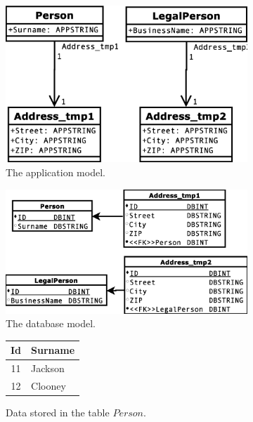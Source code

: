 \documentclass[11pt]{article}
\begin{document}
\begin{figure}
\begin{subfigure}[b]{0.45\textwidth}
	\includegraphics[width=\textwidth]{./images/case_app_5}
	\caption{The application model.}
\end{subfigure}
\begin{subfigure}[b]{0.45\textwidth}
	\includegraphics[width=\textwidth]{./images/case_db_5}
	\caption{The database model.}
\end{subfigure}
\begin{subfigure}[b]{0.5\textwidth}
	\centering
	\begin{tabular}{| c | l |}
	 	\hline
		Id &  Surname \\ \hline  
		11 & Jackson  \\ \hline
		12 & Clooney  \\ \hline
	\end{tabular}
	\caption{Data stored in the table $Person$.}
\end{subfigure}
\begin{subfigure}[b]{0.5\textwidth}
	\centering
	\begin{tabular}{| c | l |}

\end{tabular}
\end{subfigure}
\end{figure}
\end{document}

